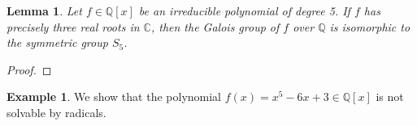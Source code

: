 \documentclass[a4paper, openany]{memoir}
\theoremstyle{definition}
\newtheorem{example}[definition]{Example}
\theoremstyle{plain}
\newtheorem{lemma}[definition]{Lemma}
\begin{document}
    \begin{lemma}
        Let $f \in \mathbb{Q}[x]$ be an irreducible polynomial of degree 5. If $f$ has precisely three real roots in $\mathbb{C}$, then the Galois group of $f$ over $\mathbb{Q}$ is isomorphic to the symmetric group $S_5$.
    \end{lemma}
    \begin{proof}
        
    \end{proof}

    \begin{example}
        We show that the polynomial $f(x) = x^5 - 6x + 3 \in \mathbb{Q}[x]$ is not solvable by radicals.
    \end{example}
\end{document}
